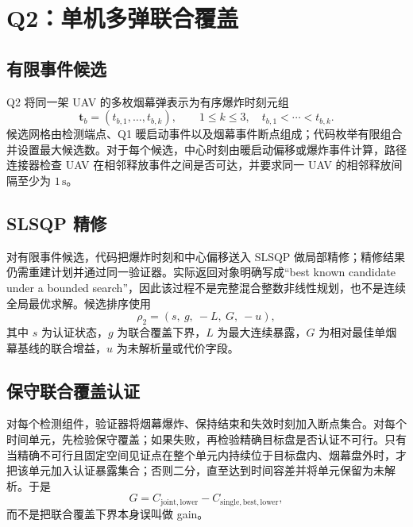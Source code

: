 \section{Q2：单机多弹联合覆盖}

\subsection{有限事件候选}

Q2 将同一架 UAV 的多枚烟幕弹表示为有序爆炸时刻元组
\begin{equation}
  \mathbf{t}_b=(t_{b,1},\ldots,t_{b,k}),\qquad 1\le k\le3,
  \quad t_{b,1}<\cdots<t_{b,k}.
  \label{eq:q2-events}
\end{equation}
候选网格由检测端点、Q1 暖启动事件以及烟幕事件断点组成；代码枚举有限组合并设置最大候选数。对于每个候选，中心时刻由暖启动偏移或爆炸事件计算，路径连接器检查 UAV 在相邻释放事件之间是否可达，并要求同一 UAV 的相邻释放间隔至少为 $1\,\mathrm{s}$。

\subsection{SLSQP 精修}

对有限事件候选，代码把爆炸时刻和中心偏移送入 SLSQP 做局部精修；精修结果仍需重建计划并通过同一验证器。实际返回对象明确写成“best known candidate under a bounded search”，因此该过程不是完整混合整数非线性规划，也不是连续全局最优求解。候选排序使用
\begin{equation}
  \rho_2=(s,\ g,\ -L,\ G,\ -u),
  \label{eq:q2-rank}
\end{equation}
其中 $s$ 为认证状态，$g$ 为联合覆盖下界，$L$ 为最大连续暴露，$G$ 为相对最佳单烟幕基线的联合增益，$u$ 为未解析量或代价字段。

\subsection{保守联合覆盖认证}

对每个检测组件，验证器将烟幕爆炸、保持结束和失效时刻加入断点集合。对每个时间单元，先检验保守覆盖；如果失败，再检验精确目标盘是否认证不可行。只有当精确不可行且固定空间见证点在整个单元内持续位于目标盘内、烟幕盘外时，才把该单元加入认证暴露集合；否则二分，直至达到时间容差并将单元保留为未解析。于是
\begin{equation}
  G=C_{\mathrm{joint,lower}}-C_{\mathrm{single,best,lower}},
  \label{eq:q2-gain}
\end{equation}
而不是把联合覆盖下界本身误叫做 gain。

